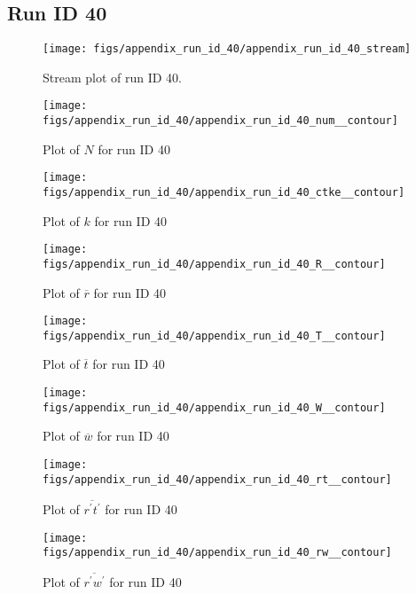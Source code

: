 \subsection{Run ID 40}
\begin{figure}[H]
\centering
\texttt{[image: figs/appendix\_run\_id\_40/appendix\_run\_id\_40\_stream]}
\caption{Stream plot of run ID 40.}
\label{fig:appendix_run_id_40_stream}
\end{figure}


\begin{figure}[H]
\centering
\texttt{[image: figs/appendix\_run\_id\_40/appendix\_run\_id\_40\_num\_\_contour]}
\caption{Plot of $N$ for run ID 40}
\label{fig:appendix_run_id_40_num__contour}
\end{figure}


\begin{figure}[H]
\centering
\texttt{[image: figs/appendix\_run\_id\_40/appendix\_run\_id\_40\_ctke\_\_contour]}
\caption{Plot of $k$ for run ID 40}
\label{fig:appendix_run_id_40_ctke__contour}
\end{figure}


\begin{figure}[H]
\centering
\texttt{[image: figs/appendix\_run\_id\_40/appendix\_run\_id\_40\_R\_\_contour]}
\caption{Plot of $\overline{r}$ for run ID 40}
\label{fig:appendix_run_id_40_R__contour}
\end{figure}


\begin{figure}[H]
\centering
\texttt{[image: figs/appendix\_run\_id\_40/appendix\_run\_id\_40\_T\_\_contour]}
\caption{Plot of $\overline{t}$ for run ID 40}
\label{fig:appendix_run_id_40_T__contour}
\end{figure}


\begin{figure}[H]
\centering
\texttt{[image: figs/appendix\_run\_id\_40/appendix\_run\_id\_40\_W\_\_contour]}
\caption{Plot of $\overline{w}$ for run ID 40}
\label{fig:appendix_run_id_40_W__contour}
\end{figure}


\begin{figure}[H]
\centering
\texttt{[image: figs/appendix\_run\_id\_40/appendix\_run\_id\_40\_rt\_\_contour]}
\caption{Plot of $\overline{r^\prime t^\prime}$ for run ID 40}
\label{fig:appendix_run_id_40_rt__contour}
\end{figure}


\begin{figure}[H]
\centering
\texttt{[image: figs/appendix\_run\_id\_40/appendix\_run\_id\_40\_rw\_\_contour]}
\caption{Plot of $\overline{r^\prime w^\prime}$ for run ID 40}
\label{fig:appendix_run_id_40_rw__contour}
\end{figure}


